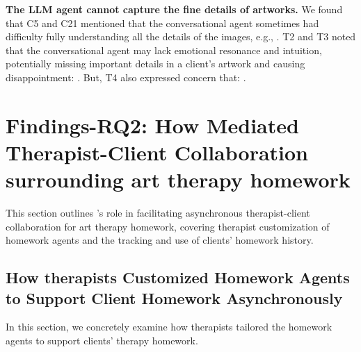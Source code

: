 \textbf{The LLM agent cannot capture the fine details of artworks.} 
We found that C5 and C21 mentioned that the conversational agent sometimes had difficulty fully understanding all the details of the images, e.g., . 
T2 and T3 noted that the conversational agent may lack emotional resonance and intuition, potentially missing important details in a client's artwork and causing disappointment: . 
But, T4 also expressed concern that: .







\section{Findings-RQ2: How \name{} Mediated Therapist-Client Collaboration surrounding art therapy homework}
This section outlines \name{}'s role in facilitating asynchronous therapist-client collaboration for art therapy homework, covering therapist customization of homework agents and the tracking and use of clients' homework history.

\subsection{How therapists Customized Homework Agents to Support Client Homework Asynchronously}
In this section, we concretely examine how therapists tailored the homework agents to support clients' therapy homework. 

